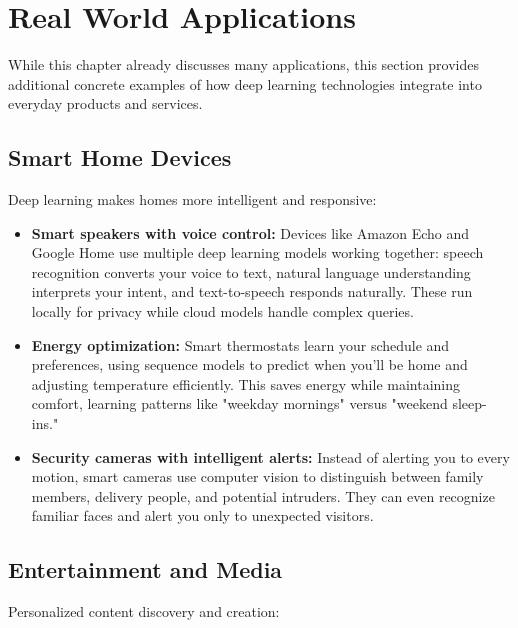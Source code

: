 
\section{Real World Applications}
\label{sec:applications-real-world}


While this chapter already discusses many applications, this section provides additional concrete examples of how deep learning technologies integrate into everyday products and services.

\subsection{Smart Home Devices}

Deep learning makes homes more intelligent and responsive:

\begin{itemize}
    \item \textbf{Smart speakers with voice control:} Devices like Amazon Echo and Google Home use multiple deep learning models working together: speech recognition converts your voice to text, natural language understanding interprets your intent, and text-to-speech responds naturally. These run locally for privacy while cloud models handle complex queries.
    
    \item \textbf{Energy optimization:} Smart thermostats learn your schedule and preferences, using sequence models to predict when you'll be home and adjusting temperature efficiently. This saves energy while maintaining comfort, learning patterns like "weekday mornings" versus "weekend sleep-ins."
    
    \item \textbf{Security cameras with intelligent alerts:} Instead of alerting you to every motion, smart cameras use computer vision to distinguish between family members, delivery people, and potential intruders. They can even recognize familiar faces and alert you only to unexpected visitors.
\end{itemize}

\subsection{Entertainment and Media}

Personalized content discovery and creation:

